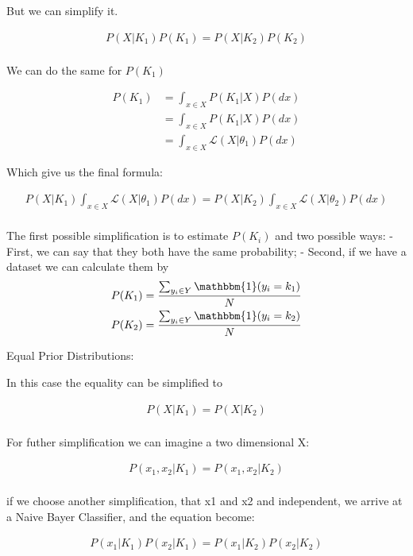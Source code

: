 \documentclass[10pt,a4paper]{article}
\begin{document}
	But we can simplify it.

	\begin{align*}
		P(X|K_1)P(K_1) = P(X|K_2)P(K_2)\\
	\end{align*}
	
	We can do the same for $P(K_1)$
	
	\begin{align*}
		P(K_1) &= \int_{x\in X}{P(K_1|X)P(dx)}\\
		&= \int_{x\in X}{P(K_1|X)P(dx)}\\
		&= \int_{x\in X}{\mathcal{L}(X|\theta_1)P(dx)}
	\end{align*}
	
	Which give us the final formula:
	
	\begin{align*}
			P(X|K_1)\int_{x\in X}{\mathcal{L}(X|\theta_1)P(dx)} = P(X|K_2)\int_{x\in X}{\mathcal{L}(X|\theta_2)P(dx)}\\
	\end{align*}
	
	The first possible simplification is to estimate $P(K_i)$ and two possible ways:
	- First, we can say that they both have the same probability;
	- Second, if we have a dataset we can calculate them by
	\begin{align*}
		P(K_1) = \frac{\sum_{y_i\in Y}{\mathbbm{1}(y_i = k_1)}}{N}\\
		P(K_2) = \frac{\sum_{y_i\in Y}{\mathbbm{1}(y_i = k_2)}}{N}\\
	\end{align*}
	
	Equal Prior Distributions:
	
	In this case the equality can be simplified to
	
	\begin{align*}
	P(X|K_1) = P(X|K_2)\\
	\end{align*}
	
	For futher simplification we can imagine a two dimensional X:
	
	\begin{align*}
	P(x_1,x_2|K_1) = P(x_1,x_2|K_2)\\
	\end{align*}
	
	if we choose another simplification, that x1 and x2 and independent, we arrive at a Naive Bayer Classifier, and the equation become:
	
	\begin{align*}
	P(x_1|K_1)P(x_2|K_1) = P(x_1|K_2)P(x_2|K_2)
	\end{align*}
	
\end{document}
